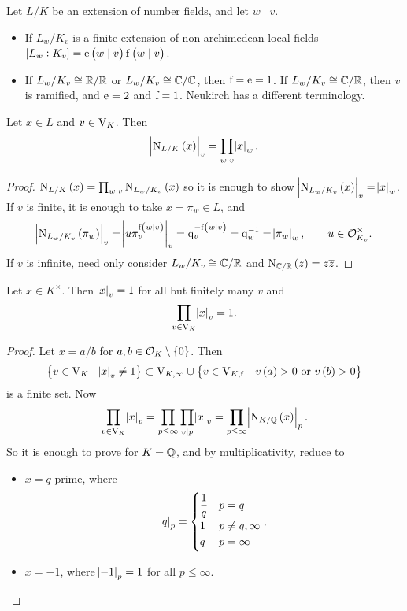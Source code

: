 Let $ L / K $ be an extension of number fields, and let $ w \mid v $.
\begin{itemize}
\item If $ L_w / K_v $ is a finite extension of non-archimedean local fields $ \sbr{L_w : K_v} = \e\br{w \mid v}\f\br{w \mid v} $.
\item If $ L_w / K_v \cong \mathbb{R} / \mathbb{R} $ or $ L_w / K_v \cong \mathbb{C} / \mathbb{C} $, then $ \mathrm{f} = \mathrm{e} = 1 $. If $ L_w / K_v \cong \mathbb{C} / \mathbb{R} $, then $ v $ is ramified, and $ \mathrm{e} = 2 $ and $ \mathrm{f} = 1 $. Neukirch has a different terminology.
\end{itemize}


\begin{proposition}
Let $ x \in L $ and $ v \in \mathrm{V}_K $. Then
$$ \abs{\N_{L / K}\br{x}}_v = \prod_{w \mid v} \abs{x}_w. $$
\end{proposition}

\begin{proof}
$ \N_{L / K}\br{x} = \prod_{w \mid v} \N_{L_w / K_v}\br{x} $ so it is enough to show $ \abs{\N_{L_w / K_v}\br{x}}_v = \abs{x}_w $. If $ v $ is finite, it is enough to take $ x = \pi_w \in L $, and
$$ \abs{\N_{L_w / K_v}\br{\pi_w}}_v = \abs{u\pi_v^{\f\br{w \mid v}}}_v = \q_v^{-\f\br{w \mid v}} = \q_w^{-1} = \abs{\pi_w}_w, \qquad u \in \OOO_{K_v}^\times. $$
If $ v $ is infinite, need only consider $ L_w / K_v \cong \mathbb{C} / \mathbb{R} $ and $ \N_{\CC / \RR}\br{z} = z\overline{z} $.
\end{proof}

\begin{theorem}
Let $ x \in K^\times $. Then $ \abs{x}_v = 1 $ for all but finitely many $ v $ and
$$ \prod_{v \in \mathrm{V}_K} \abs{x}_v = 1. $$
\end{theorem}

\begin{proof}
Let $ x = a / b $ for $ a, b \in \OOO_K \setminus \cbr{0} $. Then
$$ \cbr{v \in \V_K \st \abs{x}_v \ne 1} \subset \V_{K, \infty} \cup \cbr{v \in \V_{K, \f} \st v\br{a} > 0 \ \text{or} \ v\br{b} > 0} $$
is a finite set. Now
$$ \prod_{v \in \V_K} \abs{x}_v = \prod_{p \le \infty} \prod_{v \mid p} \abs{x}_v = \prod_{p \le \infty} \abs{\N_{K / \QQ}\br{x}}_p. $$
So it is enough to prove for $ K = \mathbb{Q} $, and by multiplicativity, reduce to
\begin{itemize}
\item $ x = q $ prime, where
$$ \abs{q}_p =
\begin{cases}
\dfrac{1}{q} & p = q \\
1 & p \ne q, \infty \\
q & p = \infty
\end{cases},
$$
\item $ x = -1 $, where $ \abs{-1}_p = 1 $ for all $ p \le \infty $.
\end{itemize}
\end{proof}

